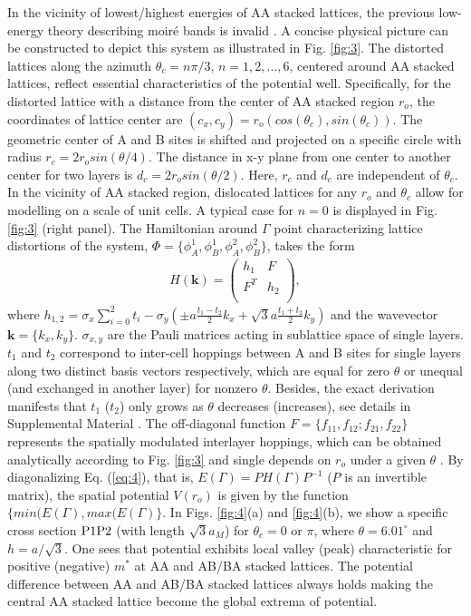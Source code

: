 \documentclass[%
reprint,
amsmath,amssymb,amsfonts
aps,
superscriptaddress,
prx
]{revtex4-1}
\begin{document}
In the vicinity of lowest/highest energies of AA stacked lattices, the previous low-energy theory describing moir\'e bands is invalid \cite{moire_band1}. A concise physical picture can be constructed to depict this system as illustrated in Fig. \ref{fig:3}. The distorted lattices along the azimuth $\theta_c=n\pi/3$, $n=1,2,...,6$, centered around AA stacked lattices, reflect essential characteristics of the potential well. Specifically, for the distorted lattice with a distance from the center of AA stacked region $r_o$, the coordinates of lattice center are $(c_x,c_y)=r_o(cos(\theta_c),sin(\theta_c))$. 
The geometric center of A and B sites is shifted and projected on a specific circle with radius $r_c=2r_osin(\theta/4)$. The distance in x-y plane from one center to another center for two layers is $d_c=2r_osin(\theta/2)$. Here, $r_c$ and $d_c$ are independent of $\theta_c$. In the vicinity of AA stacked region, dislocated lattices for any $r_o$ and $\theta_c$ allow for modelling on a scale of unit cells. A typical case for $n=0$ is displayed in Fig. \ref{fig:3} (right panel). The Hamiltonian around $\Gamma$ point characterizing lattice distortions of the system, $\Phi=\{\phi^1_A,\phi^1_B,\phi^2_{A},\phi^2_{B}\}$, takes the form \cite{gauge1} 
\begin{equation}
\begin{split}
H({\bm k}) = 
\begin{pmatrix}
       h_1&F\\
       F^T&h_2\\
\end{pmatrix},
\end{split}
\label{eq:4}
\end{equation}
where $h_{1,2}=\sigma_x\sum_{i=0}^2t_i-\sigma_y(\pm a\frac{t_1-t_2}{2}k_x+\sqrt{3}a\frac{t_1+t_2}{2}k_y)$ and the wavevector ${\bm k}=\{k_x,k_y\}$. $\sigma_{x,y}$ are the Pauli matrices acting in sublattice space of single layers. $t_1$ and $t_2$ correspond to inter-cell hoppings between A and B sites for single layers along two distinct basis vectors respectively, which are equal for zero $\theta$ or unequal (and exchanged in another layer) for nonzero $\theta$. Besides, the exact derivation manifests that $t_1$ ($t_2$) only grows as $\theta$ decreases (increases), see details in Supplemental Material \cite{SM_file}. The off-diagonal function $F=\{f_{11},f_{12};f_{21},f_{22}\}$ represents the spatially modulated interlayer hoppings, which can be obtained analytically according to Fig. \ref{fig:3} and single depends on $r_o$ under a given $\theta$ \cite{SM_file}. By diagonalizing Eq. (\ref{eq:4}), that is, $E(\Gamma)=PH(\Gamma)P^{-1}$ ($P$ is an invertible matrix), the spatial potential $V(r_o)$ is given by the function $\{min(E(\Gamma),max(E(\Gamma)\}$. In Figs. \ref{fig:4}(a) and \ref{fig:4}(b), we show a specific cross section ${\rm P1P2}$ (with length $\sqrt{3}a_M$) for $\theta_c=0$ or $\pi$, where $\theta=6.01^{\circ}$ and $h=a/\sqrt{3}$. One sees that potential exhibits local valley (peak) characteristic for positive (negative) $m^{*}$ at AA and AB/BA stacked lattices. The potential difference between AA and AB/BA stacked lattices always holds making the central AA stacked lattice become the global extrema of potential. 
\end{document}
